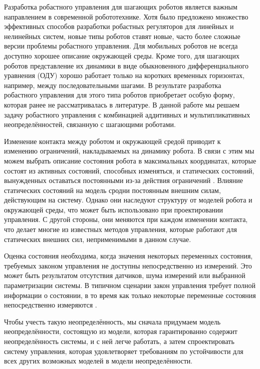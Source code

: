 Разработка робастного управления для шагающих роботов является важным направлением в современной робототехнике. Хотя было предложено множество эффективных способов разработки робастных регуляторов для линейных \cite{POLYAK2021, Nicolett2018} и нелинейных \cite{HAUSWIRTH2024, Celentano2018} систем, новые типы роботов ставят новые, часто более сложные версии проблемы робастного управления. Для мобильных роботов не всегда доступно хорошее описание окружающей среды. Кроме того, для шагающих роботов представление их динамики в виде обыкновенного дифференциального уравнения (ОДУ) хорошо работает только на коротких временных горизонтах, например, между последовательными шагами. В результате разработка робастного управления для этого типа роботов приобретает особую форму, которая ранее не рассматривалась в литературе. В данной работе мы решаем задачу робастного управления с комбинацией аддитивных и мультипликативных неопределённостей, связанную с шагающими роботами.

Изменение контакта между роботом и окружающей средой приводит к изменению ограничений, накладываемых на динамику робота. В связи с этим мы можем выбрать описание состояния робота в максимальных координатах, которые состоят из активных состояний, способных изменяться, и статических состояний, вынужденных оставаться постоянными из-за действия ограничений \cite{SAVIN2021}. Влияние статических состояний на модель сродни постоянным внешним силам, действующим на систему. Однако они наследуют структуру от моделей робота и окружающей среды, что может быть использовано при проектировании управления. С другой стороны, они меняются при каждом изменении контакта, что делает многие из известных методов управления, которые работают для статических внешних сил, неприменимыми в данном случае.

Оценка состояния необходима, когда значения некоторых переменных состояния, требуемых законом управления не доступны непосредственно из измерений. Это может быть результатом отсутствия датчиков, шума измерений или выбранной параметризации системы. В типичном сценарии закон управления требует полной информации о состоянии, в то время как только некоторые переменные состояния непосредственно измеряются \cite{Ackermann2001}.

Чтобы учесть такую неопределённость, мы сначала придумаем модель неопределённости, состоящую из модели, которая гарантированно содержит неопределённость системы, и с ней легче работать, а затем спроектировать систему управления, которая удовлетворяет требованиям по устойчивости для всех других возможных моделей в модели неопределённости.

